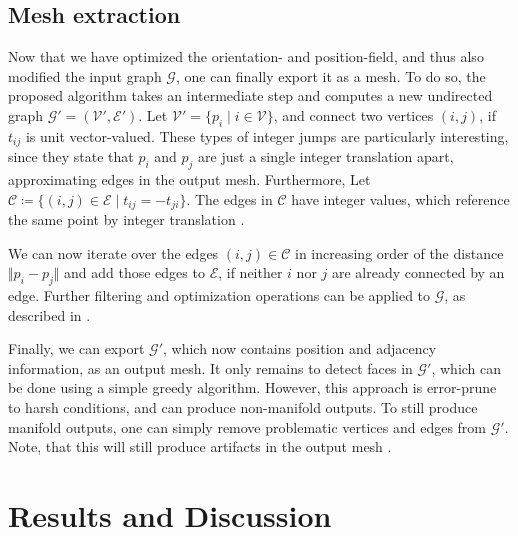 \documentclass{ACGSeminar}
\begin{document}
\subsection{Mesh extraction}
Now that we have optimized the orientation- and position-field, and thus also modified the input graph $\mathcal{G}$, one can finally export it as a mesh. To do so, the proposed algorithm takes an intermediate step and computes a new undirected graph $\mathcal{G}' = (\mathcal{V}', \mathcal{E}')$. Let $\mathcal{V}' = \{p_i \mid i \in \mathcal{V}\}$, and connect two vertices $(i,j)$, if $t_{ij}$ is unit vector-valued. These types of integer jumps are particularly interesting, since they state that $p_i$ and $p_j$ are just a single integer translation apart, approximating edges in the output mesh. Furthermore, Let $\mathcal{C} \coloneqq \{(i,j) \in \mathcal{E} \mid t_{ij} = - t_{ji}\}$. The edges in $\mathcal{C}$ have integer values, which reference the same point by integer translation \cite{jakob2015instant}.\bigskip

We can now iterate over the edges $(i,j) \in \mathcal{C}$ in increasing order of the distance $\Vert p_i - p_j \Vert$ and add those edges to $\mathcal{E}$, if neither $i$ nor $j$ are already connected by an edge. Further filtering and optimization operations can be applied to $\mathcal{G}$, as described in \cite{jakob2015instant}.

Finally, we can export $\mathcal{G}'$, which now contains position and adjacency information, as an output mesh. It only remains to detect faces in $\mathcal{G}'$, which can be done using a simple greedy algorithm. However, this approach is error-prune to harsh conditions, and can produce non-manifold outputs. To still produce manifold outputs, one can simply remove problematic vertices and edges from $\mathcal{G}'$. Note, that this will still produce artifacts in the output mesh \cite{jakob2015instant}.

\section{Results and Discussion}


\end{document}
